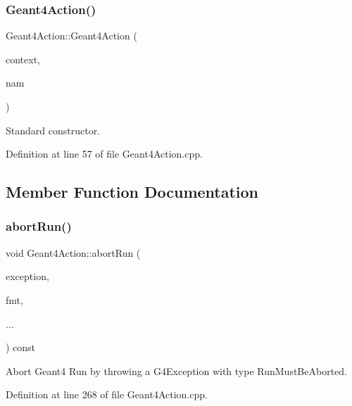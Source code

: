 \subsubsection{\texorpdfstring{Geant4\+Action()}{Geant4Action()}}
{\footnotesize\ttfamily Geant4\+Action\+::\+Geant4\+Action (\begin{DoxyParamCaption}\item[{\hyperlink{class_d_d4hep_1_1_simulation_1_1_geant4_context}{Geant4\+Context} $\ast$}]{context,  }\item[{const std\+::string \&}]{nam }\end{DoxyParamCaption})}



Standard constructor. 



Definition at line 57 of file Geant4\+Action.\+cpp.



\subsection{Member Function Documentation}
\hypertarget{class_d_d4hep_1_1_simulation_1_1_geant4_action_a2773212a37fbe7b3187e79870a4d7f65}{}\label{class_d_d4hep_1_1_simulation_1_1_geant4_action_a2773212a37fbe7b3187e79870a4d7f65} 
\subsubsection{\texorpdfstring{abort\+Run()}{abortRun()}}
{\footnotesize\ttfamily void Geant4\+Action\+::abort\+Run (\begin{DoxyParamCaption}\item[{const std\+::string \&}]{exception,  }\item[{const char $\ast$}]{fmt,  }\item[{}]{... }\end{DoxyParamCaption}) const}



Abort Geant4 Run by throwing a G4\+Exception with type Run\+Must\+Be\+Aborted. 



Definition at line 268 of file Geant4\+Action.\+cpp.




